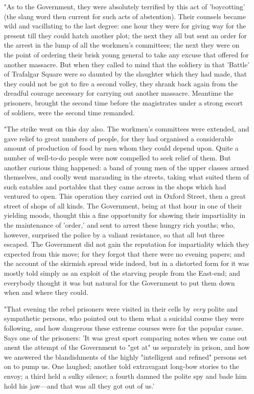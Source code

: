 "As to the Government, they were absolutely terrified by this act of
'boycotting' (the slang word then current for such acts of abstention).
Their counsels became wild and vacillating to the last degree: one hour
they were for giving way for the present till they could hatch another
plot; the next they all but sent an order for the arrest in the lump of
all the workmen's committees; the next they were on the point of
ordering their brisk young general to take any excuse that offered for
another massacre. But when they called to mind that the soldiery in that
'Battle' of Trafalgar Square were so daunted by the slaughter which they
had made, that they could not be got to fire a second volley, they
shrank back again from the dreadful courage necessary for carrying out
another massacre. Meantime the prisoners, brought the second time before
the magistrates under a strong escort of soldiers, were the second time
remanded.

"The strike went on this day also. The workmen's committees were
extended, and gave relief to great numbers of people, for they had
organised a considerable amount of production of food by men whom they
could depend upon. Quite a number of well-to-do people were now
compelled to seek relief of them. But another curious thing happened: a
band of young men of the upper classes armed themselves, and coolly went
marauding in the streets, taking what suited them of such eatables and
portables that they came across in the shops which had ventured to open.
This operation they carried out in Oxford Street, then a great street of
shops of all kinds. The Government, being at that hour in one of their
yielding moods, thought this a fine opportunity for showing their
impartiality in the maintenance of 'order,' and sent to arrest these
hungry rich youths; who, however, surprised the police by a valiant
resistance, so that all but three escaped. The Government did not gain
the reputation for impartiality which they expected from this move; for
they forgot that there were no evening papers; and the account of the
skirmish spread wide indeed, but in a distorted form for it was mostly
told simply as an exploit of the starving people from the East-end; and
everybody thought it was but natural for the Government to put them down
when and where they could.

"That evening the rebel prisoners were visited in their cells by
\emph{very} polite and sympathetic persons, who pointed out to them what
a suicidal course they were following, and how dangerous these extreme
courses were for the popular cause. Says one of the prisoners: 'It was
great sport comparing notes when we came out anent the attempt of the
Government to "get at" us separately in prison, and how we answered the
blandishments of the highly "intelligent and refined" persons set on to
pump us. One laughed; another told extravagant long-bow stories to the
envoy; a third held a sulky silence; a fourth damned the polite spy and
bade him hold his jaw---and that was all they got out of us.'


